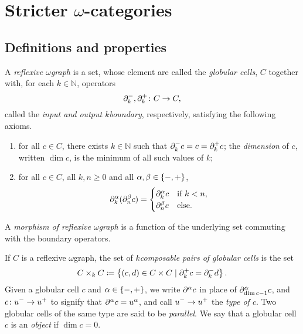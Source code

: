\section{Stricter \texorpdfstring{$\omega$}{ω}-categories} \label{sec:stricter}

\subsection{Definitions and properties}

\begin{dfn} 
    A \emph{reflexive \( \omega \)\nbd graph} is a set, whose element are called the \emph{globular cells}, \( C \) together with, for each \( k \in \mathbb{N} \), operators
    \begin{equation*}
        \partial_{k}^{-}, \partial_{k}^{+} \colon C \to C,
    \end{equation*}
    called the \emph{input and output \( k \)\nbd boundary}, respectively, satisfying the following axioms.
    \begin{enumerate}
        \item for all \( c \in C \), there exists \( k \in \mathbb{N} \) such that \( \partial_{k}^{-} c = c = \partial_{k}^{+} c \); the \emph{dimension} of \( c \), written \( \dim c \), is the minimum of all such values of \( k \);
        \item for all \( c \in C \), all \( k, n \geq 0 \) and all \( \alpha, \beta \in \left\{ {-, +} \right\} \),
        \begin{equation*}
            \partial_{k}^{\alpha}(\partial_{n}^{\beta} c) = 
            \begin{cases}
                \partial_{k}^{\alpha} c & \text{if }k < n, \\
                \partial_{n}^{\beta} c& \text{else.}
            \end{cases}
        \end{equation*}
    \end{enumerate}
    A \emph{morphism of reflexive \( \omega \)\nbd graph} is a function of the underlying set commuting with the boundary operators.
\end{dfn}

\noindent If \( C \) is a reflexive \( \omega \)\nbd graph, the set of \emph{\( k \)\nbd composable pairs of globular cells} is the set 
\begin{equation*}
    C \times_k C \coloneqq \left\{ {(c, d) \in C \times C \mid \partial_{k}^{+} c = \partial_{k}^{-} d} \right\}.
\end{equation*}
Given a globular cell \( c \) and \( \alpha \in \left\{ {-, +} \right\} \), we write \( \partial_{}^{\alpha} c \) in place of \( \partial_{\dim c - 1}^{\alpha} c \), and \( c \colon u^- \to u^+ \) to signify that \( \partial_{}^{\alpha} c = u^\alpha \), and call \( u^- \to u^+ \) the \emph{type of \( c \)}. 
Two globular cells of the same type are said to be \emph{parallel}.
We say that a globular cell \( c \) is an \emph{object} if \( \dim c = 0 \). 


